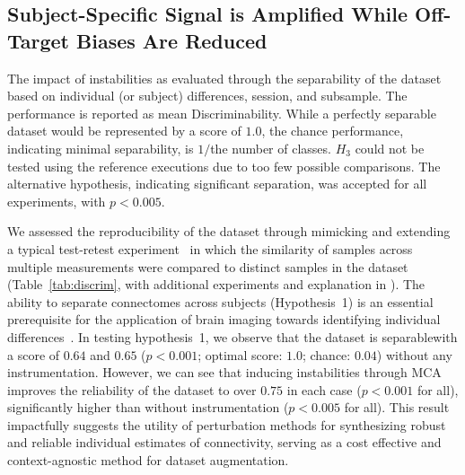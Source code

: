 \documentclass[fleqn,10pt]{SelfArx} %
\begin{document}
\subsection*{Subject-Specific Signal is Amplified While Off-Target Biases Are Reduced}
\begin{table}[ht]\centering
\caption{The impact of instabilities as evaluated through the separability of the dataset based on individual (or
subject) differences, session, and subsample. The performance is reported as mean Discriminability. While a perfectly
separable dataset would be represented by a score of $1.0$, the chance performance, indicating minimal separability, is
$1 /$the number of classes. $H_3$ could not be tested using the reference executions due to too few possible
comparisons. The alternative hypothesis, indicating significant separation, was accepted for all experiments, with
$p < 0.005$.}
\vspace{5pt}

\label{tab:discrim}
\end{table}

We assessed the reproducibility of the dataset through mimicking and extending a typical test-retest
experiment~\cite{bridgeford2020elim} in which the similarity of samples across multiple measurements were
compared to distinct samples in the dataset (Table~\ref{tab:discrim}, with additional experiments and explanation in
). The ability to separate connectomes across subjects (Hypothesis~1) is an essential
prerequisite for the application of brain imaging towards identifying individual differences~\cite{Dubois2016-yr}. In
testing hypothesis~1, we observe that the dataset is separablewith a score of $0.64$ and $0.65$ ($p < 0.001$; optimal
score: $1.0$; chance: $0.04$) without any instrumentation. However, we can see that inducing instabilities through MCA
improves the reliability of the dataset to over $0.75$ in each case ($p < 0.001$ for all), significantly higher than
without instrumentation ($p < 0.005$ for all). This result impactfully suggests the utility of perturbation methods for
synthesizing robust and reliable individual estimates of connectivity, serving as a cost effective and context-agnostic
method for dataset augmentation.
\end{document}
